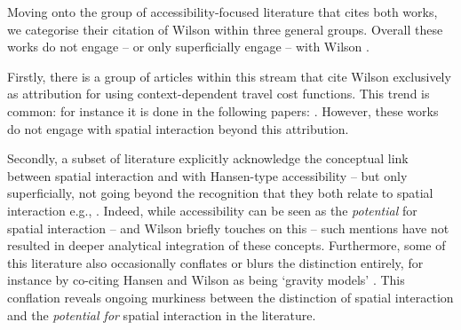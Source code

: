 \documentclass[
  10pt,
  letterpaper,
]{article}
\begin{document}
Moving onto the group of accessibility-focused literature that cites
both works, we categorise their citation of Wilson \citep{wilson1971}
within three general groups. Overall these works do not engage -- or
only superficially engage -- with Wilson \citep{wilson1971}.

Firstly, there is a group of articles within this stream that cite
Wilson \citep{wilson1971} exclusively as attribution for using
context-dependent travel cost functions. This trend is common: for
instance it is done in the following papers:
\citep{handyMeasuringAccessibilityExploration1997, weibullNumericalMeasurementAccessibility1980, kwan1998space, shenLocationCharacteristicsInnercity1998, ashiru2003space, rau2012spatial, pan2013impacts, margaridacondecomelhoradoImpactMeasuringInternal2016, caschili2015accessibility, grengs2015nonwork, pan2020measuring, chia2020extending, roblot2021participation, sharifiasl2023incorporating, kharel2024examining}.
However, these works do not engage with spatial interaction beyond this
attribution.

Secondly, a subset of literature explicitly acknowledge the conceptual
link between spatial interaction and with Hansen-type accessibility --
but only superficially, not going beyond the recognition that they both
relate to spatial interaction e.g.,
\citep{grengs2010job, millerMeasuringSpaceTimeAccessibility1999, giuliano2010accessibility, grengs2010intermetropolitan, grengs2012equity, levine2012does, levinson2012positive, tong2015transportation, liu2015spatial, he2017measuring, wuUnifyingAccess2020, ng2022reflection, naqavi2023mobility, suel2024measuring}.
Indeed, while accessibility can be seen as the \emph{potential} for
spatial interaction -- and Wilson \citep{wilson1971} briefly touches on
this -- such mentions have not resulted in deeper analytical integration
of these concepts. Furthermore, some of this literature also
occasionally conflates or blurs the distinction entirely, for instance
by co-citing Hansen and Wilson as being `gravity models'
\citep[e.g.,][]{liu2004accessibility, dai2017visualization, shen2019segregation, chia2020extending}.
This conflation reveals ongoing murkiness between the distinction of
spatial interaction and the \emph{potential for} spatial interaction in
the literature.
\end{document}

